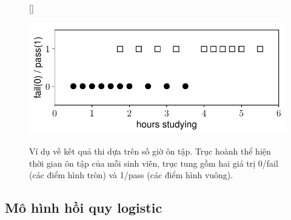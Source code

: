 \begin{figure}[t]
[\FBwidth]
{\caption{
Ví dụ về kết quả thi dựa trên số giờ ôn tập. Trục hoành thể hiện thời gian ôn tập của mỗi sinh viên, trục tung gồm hai giá trị 0/fail (các điểm hình tròn) và 1/pass (các điểm hình vuông).
}
\label{fig:10_1}}
{ %
\includegraphics[width=.5\textwidth]{ebookML_src/src/logistic_regression/ex1.pdf}
}
\end{figure}


\subsection{Mô hình hồi quy logistic}


